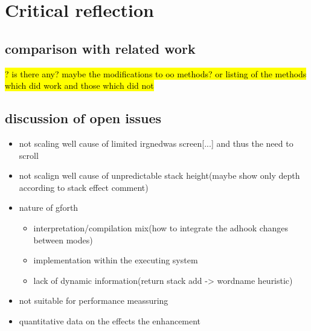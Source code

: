 \chapter{Critical reflection}

\section{comparison with related work}

\hl{? is there any? maybe the modifications to oo methods? or listing of the methods which did work and those which did not}

\section{discussion of open issues}

\begin{itemize}
\item not scaling well cause of limited irgnedwas screen[...] and thus the need to scroll
\item not scalign well cause of unpredictable stack height(maybe show only depth according to stack effect comment)
\item nature of gforth
\begin{itemize}
\item interpretation/compilation mix(how to integrate the adhook changes between modes)
\item implementation within the executing system
\item lack of dynamic information(return stack add -> wordname heuristic)
\end{itemize}
\item not suitable for performance meassuring
\item quantitative data on the effects the enhancement
\end{itemize}
